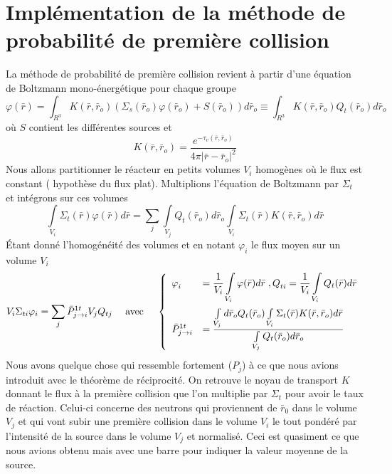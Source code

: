 \section{Implémentation de la méthode de probabilité de première collision}
La méthode de probabilité de première collision revient à partir d'une équation de Boltzmann 
mono-énergétique pour chaque groupe
\begin{equation}
\varphi (\bar r) = \int_{{R^3}}^{} {  K(\bar r,{{\bar r}_o})} ({\Sigma _s}({\bar r_o})\varphi ({\bar r_o}) + S({\bar r_o}))d{\bar r_o}  \equiv \int_{{R^3}}^{} {  K(\bar r,{{\bar r}_o})} {Q_t}({\bar r_o})d{\bar r_o}
\end{equation}
où $S$ contient les différentes sources et 
\begin{equation}
K(\bar r,{\bar r_o}) = \frac{{{e^{ - {\tau _v}(\bar r,{{\bar r}_o})}}}}{{4\pi {{\left| {\bar r - {{\bar r}_o}} \right|}^2}}}
\end{equation}
Nous allons partitionner le réacteur en petits volumes $V_i$ homogènes où le flux est constant (
hypothèse du flux plat). Multiplions l'équation de Boltzmann par $\Sigma_t$ et intégrons sur ces 
volumes
\begin{equation}
\int\limits_{{V_i}}    {\Sigma _t}(\bar r)\varphi (\bar r)d\bar r = \sum\limits_j    \int\limits_{{V_j}}    {Q_t}({\bar r_o})d{\bar r_o}\int\limits_{{V_i}}   {\Sigma _t}(\bar r)K(\bar r,{\bar r_o})d\bar r
\end{equation}
Étant donné l'homogénéité des volumes et en notant $\varphi_i$ le flux moyen sur un volume $V_i$
\begin{equation}
\DS{V_i}{\Sigma _{ti}}{\varphi _i} = \sum\limits_j    \bar P_{j \to i}^{1t}{V_j}{Q_{tj}}\quad\text{ avec }\quad \left\{\begin{array}{ll}
\DS\varphi _i^{} &\DS= \frac{1}{{{V_i}}}\int\limits_{{V_i}}    \varphi (\bar r)d\bar r\;,
Q_{ti}^{} = \frac{1}{{{V_i}}}\int\limits_{{V_i}}    {Q_t}(\bar r)d\bar r\vspace{2mm}\\
\DS\bar P_{j \to i}^{1t} &\DS= \frac{{\int\limits_{{V_j}}    d{{\bar r}_o}{Q_t}({{\bar r}_o})\int\limits_{{V_i}}    {\Sigma _t}(\bar r)K(\bar r,{{\bar r}_o})d\bar r}}{{\int\limits_{{V_j}}    {Q_t}({{\bar r}_o})d{{\bar r}_o}}}
\end{array}\right.
\label{eq:Ch3.6}
\end{equation}
Nous avons quelque chose qui ressemble fortement ($P_j$) à ce que nous avions introduit avec le 
théorème de réciprocité. On retrouve le noyau de transport $K$ donnant le flux à la première collision 
que l'on multiplie par $\Sigma_t$ pour avoir le taux de réaction. Celui-ci concerne des neutrons qui
proviennent de $\bar r_0$ dans le volume $V_j$ et qui vont subir une première collision dans le 
volume $V_i$ le tout pondéré par l'intensité de la source dans le volume $V_j$ et normalisé. Ceci 
est quasiment ce que nous avions obtenu mais avec une barre pour indiquer la valeur moyenne de la 
source.\\

